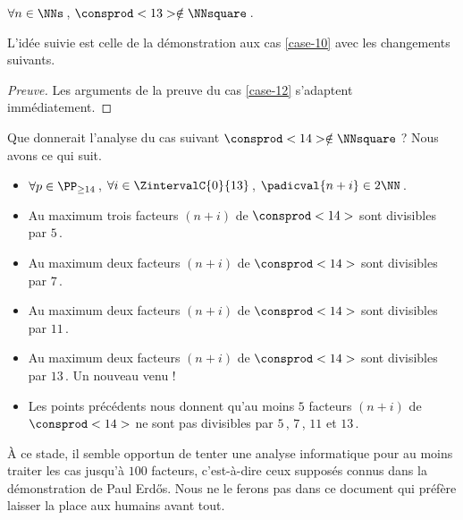 \begin{fact} \label{case-13}
	 $\forall n \in \NNs$\,, $\consprod<13> \notin \NNsquare$\,.
\end{fact}



L'idée suivie est celle de la démonstration aux cas \ref{case-10} avec les changements suivants.


\begin{proof}[Preuve]%
    Les arguments de la preuve du cas \ref{case-12} s'adaptent immédiatement.
\end{proof}




\begin{remark}
	Que donnerait l'analyse du cas suivant $\consprod<14> \notin \NNsquare$ ?
	Nous avons ce qui suit.
    \begin{itemize}
		\item $\forall p \in \PP_{\geq 14}$\,, 
    $\forall i \in \ZintervalC{0}{13}$\,, 
    $\padicval{n + i} \in 2 \NN$\,.
		
		\item Au maximum trois facteurs $(n + i)$ de $\consprod<14>$ sont divisibles par $5$\,.

		\item Au maximum deux facteurs $(n + i)$ de $\consprod<14>$ sont divisibles par $7$\,.

		\item Au maximum deux facteurs $(n + i)$ de $\consprod<14>$ sont divisibles par $11$\,.

		\item Au maximum deux facteurs $(n + i)$ de $\consprod<14>$ sont divisibles par $13$\,. Un nouveau venu !

		\item Les points précédents nous donnent qu'au moins $5$ facteurs $(n + i)$ de $\consprod<14>$ ne sont pas divisibles par $5$\,, $7$\,, $11$ et $13$\,.
    \end{itemize}
    
    À ce stade, il semble opportun de tenter une analyse informatique pour au moins traiter les cas jusqu'à $100$ facteurs, c'est-à-dire ceux supposés connus dans la démonstration de Paul Erdős. Nous ne le ferons pas dans ce document qui préfère laisser la place aux humains avant tout.
\end{remark}
